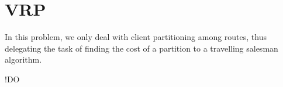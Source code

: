 \section{\texorpdfstring{\Acrlong*{VRP}}{Vehicle routing problem}} \label{algorithm-vrp}
In this problem, we only deal with client partitioning among routes, thus delegating the task of finding the cost of a partition to a travelling salesman algorithm.\par
!DO



